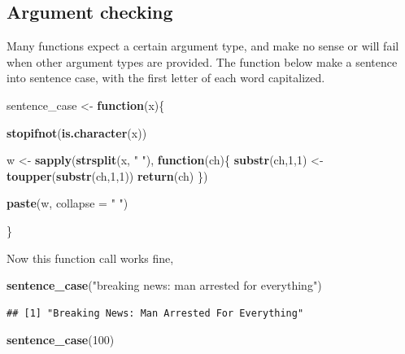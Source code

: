\documentclass[]{book}
\newenvironment{Shaded}{\begin{snugshade}}{\end{snugshade}}
\newcommand{\ControlFlowTok}[1]{\textcolor[rgb]{0.13,0.29,0.53}{\textbf{#1}}}
\newcommand{\DataTypeTok}[1]{\textcolor[rgb]{0.13,0.29,0.53}{#1}}
\newcommand{\DecValTok}[1]{\textcolor[rgb]{0.00,0.00,0.81}{#1}}
\newcommand{\KeywordTok}[1]{\textcolor[rgb]{0.13,0.29,0.53}{\textbf{#1}}}
\newcommand{\NormalTok}[1]{#1}
\newcommand{\StringTok}[1]{\textcolor[rgb]{0.31,0.60,0.02}{#1}}
\begin{document}
\hypertarget{argument-checking}{%
\subsection{Argument checking}\label{argument-checking}}

Many functions expect a certain argument type, and make no sense or will fail when other argument types are provided. The function below make a sentence into sentence case, with the first letter of each word capitalized.

\begin{Shaded}
\begin{Highlighting}[]
\NormalTok{sentence_case <-}\StringTok{ }\ControlFlowTok{function}\NormalTok{(x)\{}
  
  \KeywordTok{stopifnot}\NormalTok{(}\KeywordTok{is.character}\NormalTok{(x))}
  
\NormalTok{  w <-}\StringTok{ }\KeywordTok{sapply}\NormalTok{(}\KeywordTok{strsplit}\NormalTok{(x, }\StringTok{" "}\NormalTok{), }\ControlFlowTok{function}\NormalTok{(ch)\{}
    \KeywordTok{substr}\NormalTok{(ch,}\DecValTok{1}\NormalTok{,}\DecValTok{1}\NormalTok{) <-}\StringTok{ }\KeywordTok{toupper}\NormalTok{(}\KeywordTok{substr}\NormalTok{(ch,}\DecValTok{1}\NormalTok{,}\DecValTok{1}\NormalTok{))  }
    \KeywordTok{return}\NormalTok{(ch)}
\NormalTok{  \})}
  
  \KeywordTok{paste}\NormalTok{(w, }\DataTypeTok{collapse =} \StringTok{" "}\NormalTok{)}
  
\NormalTok{\}}
\end{Highlighting}
\end{Shaded}

Now this function call works fine,

\begin{Shaded}
\begin{Highlighting}[]
\KeywordTok{sentence_case}\NormalTok{(}\StringTok{"breaking news: man arrested for everything"}\NormalTok{)}
\end{Highlighting}
\end{Shaded}

\begin{verbatim}
## [1] "Breaking News: Man Arrested For Everything"
\end{verbatim}

\begin{Shaded}
\begin{Highlighting}[]
\KeywordTok{sentence_case}\NormalTok{(}\DecValTok{100}\NormalTok{)}
\end{Highlighting}
\end{Shaded}
\end{document}

